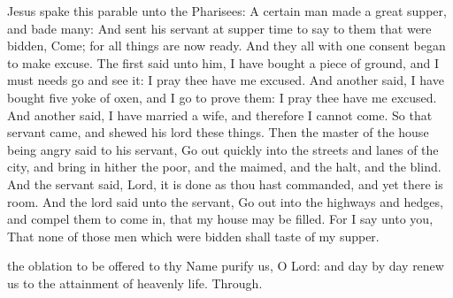 
\vspace{-0.25\baselineskip}


\vspace{-0.1\baselineskip}

 Jesus spake this parable unto the Pharisees: A certain man made a great supper, and bade many: And sent his servant at supper time to say to them that were bidden, Come; for all things are now ready. And they all with one consent began to make excuse. The first said unto him, I have bought a piece of ground, and I must needs go and see it: I pray thee have me excused. And another said, I have bought five yoke of oxen, and I go to prove them: I pray thee have me excused. And another said, I have married a wife, and therefore I cannot come. So that servant came, and shewed his lord these things. Then the master of the house being angry said to his servant, Go out quickly into the streets and lanes of the city, and bring in hither the poor, and the maimed, and the halt, and the blind. And the servant said, Lord, it is done as thou hast commanded, and yet there is room. And the lord said unto the servant, Go out into the highways and hedges, and compel them to come in, that my house may be filled. For I say unto you, That none of those men which were bidden shall taste of my supper.


\vspace{-0.25\baselineskip}

\secret

\vspace{-0.1\baselineskip}

 the oblation to be offered to thy Name purify us, O Lord: and day by day renew us to the attainment of heavenly life. Through.\\


